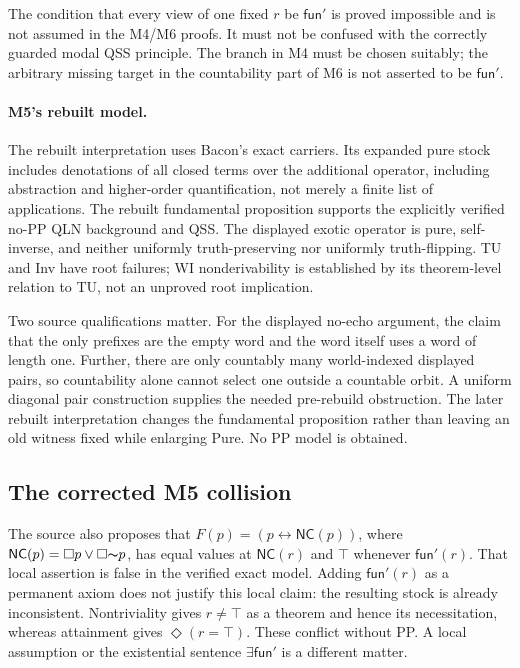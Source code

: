 \documentclass[12pt,leqno]{article}
\newcommand{\OR}{\ensuremath{\vee}}
\newcommand{\IFF}{\ensuremath{\leftrightarrow}}
\newcommand{\NOT}{\ensuremath{\text{$\thicksim$}}}
\newcommand{\funp}{\mathsf{fun}'}
\newcommand{\NC}{\mathsf{NC}}
\begin{document}
The condition that every view of one fixed $r$ be $\funp$ is proved
impossible and is not assumed in the M4/M6 proofs. It must not
be confused with the correctly guarded modal QSS principle. The branch
in M4 must be chosen suitably; the arbitrary missing target in the
countability part of M6 is not asserted to be $\funp$.

\paragraph{M5's rebuilt model.}
The rebuilt interpretation uses Bacon's exact carriers.
Its expanded pure stock includes denotations of all closed terms over
the additional operator, including abstraction and higher-order
quantification, not merely a finite list of applications. The rebuilt
fundamental proposition supports the explicitly verified no-PP QLN
background and QSS. The displayed exotic operator is pure, self-inverse,
and neither uniformly truth-preserving nor uniformly truth-flipping.
TU and Inv have root failures; WI nonderivability is established by its
theorem-level relation to TU, not an unproved root implication.

Two source qualifications matter. For the displayed no-echo argument,
the claim that the only prefixes are the empty word and the word itself
uses a word of length one. Further, there are only countably many
world-indexed displayed pairs, so countability alone cannot select one
outside a countable orbit. A uniform diagonal pair construction supplies
the needed pre-rebuild obstruction. The later rebuilt interpretation
changes the fundamental proposition rather than leaving an old witness
fixed while enlarging Pure. No PP model is obtained.

\subsection{The corrected M5 collision}

The source also proposes that $F(p)=(p\IFF\NC(p))$, where
$\NC(p)=\Box p\OR\Box\NOT p$, has equal values at $\NC(r)$ and
$\top$ whenever $\funp(r)$. That local assertion is false in the
verified exact model. Adding $\funp(r)$ as a permanent axiom does not
justify this local claim: the resulting stock is already inconsistent.
Nontriviality gives $r\neq\top$ as
a theorem and hence its necessitation, whereas attainment gives
$\Diamond(r=\top)$. These conflict without PP. A local assumption or
the existential sentence $\exists\funp$ is a different matter.
\end{document}
